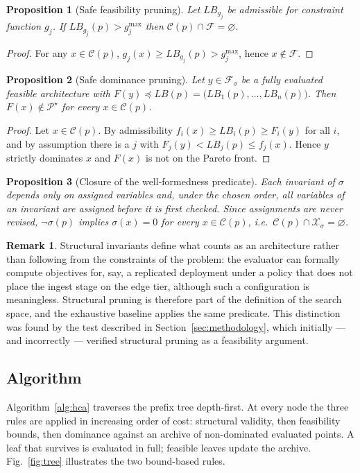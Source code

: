 \documentclass[preprint,11pt,3p]{elsarticle}
\theoremstyle{plain}
\newtheorem{proposition}{Proposition}
\theoremstyle{definition}
\newtheorem{remark}{Remark}
\newcommand{\X}{\mathcal{X}}
\newcommand{\C}{\mathcal{C}}
\newcommand{\F}{\mathcal{F}}
\newcommand{\PS}{\mathcal{P}^{\star}}
\newcommand{\LB}{\mathit{LB}}
\begin{document}
\begin{proposition}[Safe feasibility pruning]
\label{prop:feas}
Let $\LB_{g_j}$ be admissible for constraint function $g_j$. If
$\LB_{g_j}(p)>g_j^{\max}$ then $\C(p)\cap\F=\varnothing$.
\end{proposition}
\begin{proof}
For any $x\in\C(p)$, $g_j(x)\ge \LB_{g_j}(p)>g_j^{\max}$, hence $x\notin\F$.
\end{proof}

\begin{proposition}[Safe dominance pruning]
\label{prop:dom}
Let $y\in\F_\sigma$ be a fully evaluated feasible architecture with
$F(y)\preceq \LB(p)=\big(\LB_1(p),\dots,\LB_n(p)\big)$. Then $F(x)\notin\PS$ for every
$x\in\C(p)$.
\end{proposition}
\begin{proof}
Let $x\in\C(p)$. By admissibility $f_i(x)\ge \LB_i(p)\ge F_i(y)$ for all $i$, and by
assumption there is a $j$ with $F_j(y)<\LB_j(p)\le f_j(x)$. Hence $y$ strictly dominates
$x$ and $F(x)$ is not on the Pareto front.
\end{proof}

\begin{proposition}[Closure of the well-formedness predicate]
\label{prop:struct}
Each invariant of $\sigma$ depends only on assigned variables and, under the chosen
order, all variables of an invariant are assigned before it is first checked. Since
assignments are never revised, $\neg\sigma(p)$ implies $\sigma(x)=0$ for every
$x\in\C(p)$, i.e.\ $\C(p)\cap\X_\sigma=\varnothing$.
\end{proposition}

\begin{remark}
Structural invariants define what counts as an architecture rather than following from
the constraints of the problem: the evaluator can formally compute objectives for, say, a
replicated deployment under a policy that does not place the ingest stage on the edge
tier, although such a configuration is meaningless. Structural pruning is therefore part
of the definition of the search space, and the exhaustive baseline applies the same
predicate. This distinction was found by the test described in
Section~\ref{sec:methodology}, which initially --- and incorrectly --- verified structural
pruning as a feasibility argument.
\end{remark}

\subsection{Algorithm}
Algorithm~\ref{alg:hca} traverses the prefix tree depth-first. At every node the three
rules are applied in increasing order of cost: structural validity, then feasibility
bounds, then dominance against an archive of non-dominated evaluated points. A leaf that
survives is evaluated in full; feasible leaves update the archive. Fig.~\ref{fig:tree}
illustrates the two bound-based rules.
\end{document}
